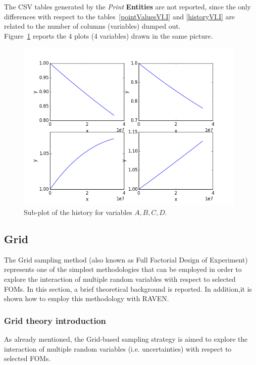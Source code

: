 The CSV tables generated by the \textit{Print} \textbf{Entities} are not reported, since the only differences with respect to the  tables~\ref{pointValuesVI.I} and \ref{historyVI.I} are related to the number of columns (variables)
dumped out. 
\\Figure~\ref{fig:historySubPlotLine} reports the 4 plots (4 variables) drawn in the same picture. 
 \begin{figure}[h!]
  \centering
  \includegraphics[scale=0.7]{pics/1-historyPlot_line-line-line-line-subPlots.png}
  \caption{Sub-plot of the history for variables $A,B,C,D$.}
  \label{fig:historySubPlotLine}
 \end{figure}

\subsection{Grid}
\label{sub:Grid}
The Grid sampling method (also known as Full Factorial Design of 
Experiment) represents one of the simplest methodologies that can be 
employed in order to explore the interaction of multiple random 
variables with respect to selected FOMs.
In this section, a brief theoretical 
background is reported. In addition,it is shown how to employ this methodology with RAVEN.
\subsubsection{Grid theory introduction}
\label{subsub:Gridtheory}
As already mentioned, the Grid-based sampling strategy is aimed to
explore the interaction of multiple random variables (i.e. uncertainties) 
with respect to selected FOMs.